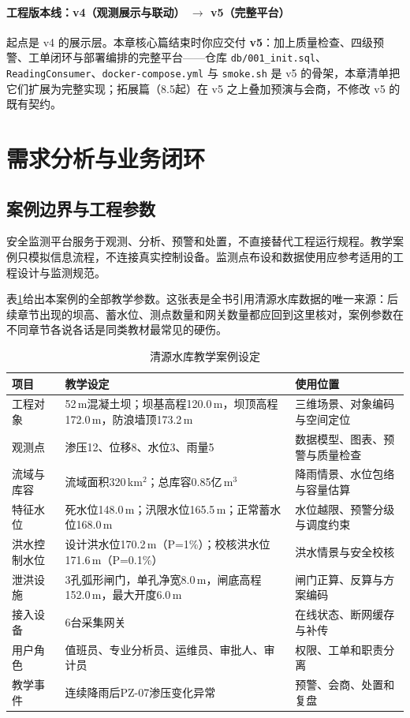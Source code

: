 \begin{tipbox}
\paragraph{工程版本线：v4（观测展示与联动） $\rightarrow$ v5（完整平台）}起点是 v4 的展示层。本章核心篇结束时你应交付 \textbf{v5}：加上质量检查、四级预警、工单闭环与部署编排的完整平台——仓库 \texttt{db/001\_init.sql}、\texttt{ReadingConsumer}、\texttt{docker-compose.yml} 与 \texttt{smoke.sh} 是 v5 的骨架，本章清单把它们扩展为完整实现；拓展篇（8.5起）在 v5 之上叠加预演与会商，不修改 v5 的既有契约。
\end{tipbox}

\section{需求分析与业务闭环}

\subsection{案例边界与工程参数}

安全监测平台服务于观测、分析、预警和处置，不直接替代工程运行规程。教学案例只模拟信息流程，不连接真实控制设备。监测点布设和数据使用应参考适用的工程设计与监测规范\cite{sl6012013,slt7252016}。

表\ref{tab:case-parameters}给出本案例的全部教学参数。这张表是全书引用清源水库数据的唯一来源：后续章节出现的坝高、蓄水位、测点数量和网关数量都应回到这里核对，案例参数在不同章节各说各话是同类教材最常见的硬伤。

\begin{table}[htbp]
\centering
\caption{清源水库教学案例设定}
\label{tab:case-parameters}
\begin{tabular}{p{2.8cm}p{3.5cm}p{6.0cm}}
\toprule
项目 & 教学设定 & 使用位置 \\
\midrule
工程对象 & 52\,m混凝土坝；坝基高程120.0\,m，坝顶高程172.0\,m，防浪墙顶173.2\,m & 三维场景、对象编码与空间定位 \\
观测点 & 渗压12、位移8、水位3、雨量5 & 数据模型、图表、预警与质量检查 \\
流域与库容 & 流域面积320\,km$^2$；总库容0.85亿\,m$^3$ & 降雨情景、水位包络与容量估算 \\
特征水位 & 死水位148.0\,m；汛限水位165.5\,m；正常蓄水位168.0\,m & 水位越限、预警分级与调度约束 \\
洪水控制水位 & 设计洪水位170.2\,m（P=1\%）；校核洪水位171.6\,m（P=0.1\%） & 洪水情景与安全校核 \\
泄洪设施 & 3孔弧形闸门，单孔净宽8.0\,m，闸底高程152.0\,m，最大开度6.0\,m & 闸门正算、反算与方案编码 \\
接入设备 & 6台采集网关 & 在线状态、断网缓存与补传 \\
用户角色 & 值班员、专业分析员、运维员、审批人、审计员 & 权限、工单和职责分离 \\
教学事件 & 连续降雨后PZ-07渗压变化异常 & 预警、会商、处置和复盘 \\
\bottomrule
\end{tabular}
\end{table}


